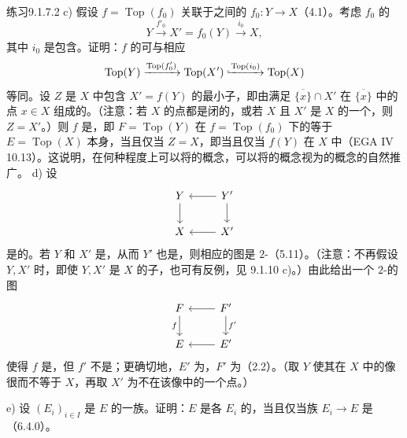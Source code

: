 \begin{SGAresult}{练习}{9.1.7.2}
c) 假设 $f=\operatorname{Top}(f_0)$ 关联于之间的 $f_0:Y\to X$（4.1）。考虑 $f_0$ 的
\[
Y\xrightarrow{f'_0}X'=f_0(Y)\xrightarrow{i_0}X,
\]
其中 $i_0$ 是包含。证明：$f$ 的可与相应
\[
\operatorname{Top}(Y)\xrightarrow{\operatorname{Top}(f'_0)}\operatorname{Top}(X')\lhook\joinrel\xrightarrow{\operatorname{Top}(i_0)}\operatorname{Top}(X)
\]
等同。设 $Z$ 是 $X$ 中包含 $X'=f(Y)$ 的最小子，即由满足 $\overline{\{x\}}\cap X'$ 在 $\overline{\{x\}}$ 中的点 $x\in X$ 组成的。（注意：若 $X$ 的点都是闭的，或若 $X$ 且 $X'$ 是 $X$ 的一个，则 $Z=X'$。）则 $f$ 是，即 $F=\operatorname{Top}(Y)$ 在 $f=\operatorname{Top}(f_0)$ 下的等于 $E=\operatorname{Top}(X)$ 本身，当且仅当 $Z=X$，即当且仅当 $f(Y)$ 在 $X$ 中（EGA IV 10.13）。这说明，在何种程度上可以将的概念，可以将的概念视为的概念的自然推广。
d) 设
\[
\begin{tikzcd}
Y\arrow[d]&Y'\arrow[l]\arrow[d]\\
X&X'\arrow[l]
\end{tikzcd}
\]
是的。若 $Y$ 和 $X'$ 是，从而 $Y'$ 也是，则相应的图是 $2$-（5.11）。（注意：不再假设 $Y,X'$ 时，即使 $Y,X'$ 是 $X$ 的子，也可有反例，见 9.1.10 c)。）由此给出一个 $2$-的图
\[
\begin{tikzcd}
F\arrow[d,"f"']&F'\arrow[l]\arrow[d,"f'"]\\
E&E'\arrow[l]
\end{tikzcd}
\]
使得 $f$ 是，但 $f'$ 不是；更确切地，$E'$ 为，$F'$ 为（2.2）。（取 $Y$ 使其在 $X$ 中的像很而不等于 $X$，再取 $X'$ 为不在该像中的一个点。）

e) 设 $(E_i)_{i\in I}$ 是 $E$ 的一族。证明：$E$ 是各 $E_i$ 的，当且仅当族 $E_i\to E$ 是（6.4.0）。
\end{SGAresult}

